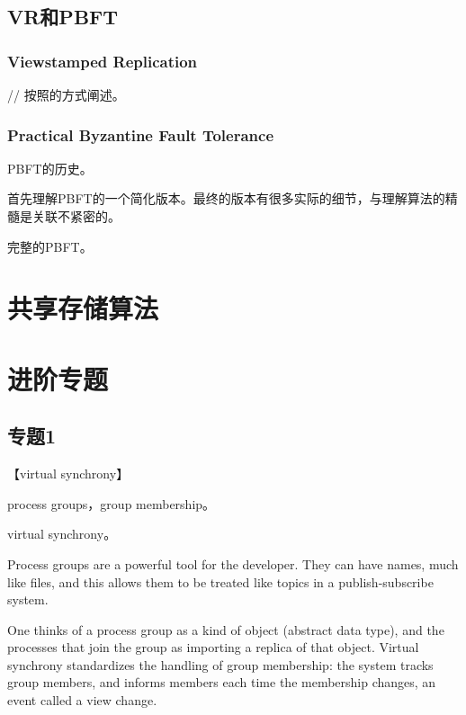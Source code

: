 \documentclass[UTF8]{ctexrep}
\begin{document}
\chapter{VR和PBFT}

\section{Viewstamped Replication}

// 按照\citep[Chap.7]{Bost10}的方式阐述。

\section{Practical Byzantine Fault Tolerance}

PBFT的历史。

首先理解PBFT的一个简化版本。最终的版本有很多实际的细节，与理解算法的精髓是关联不紧密的。

完整的PBFT。

\citep[Chap.7]{Bost10}


\part{共享存储算法}


\part{进阶专题}

\chapter{专题1}


【virtual synchrony】

process groups，group membership。

virtual synchrony。

\cite[Chap.6]{Bost10}

Process groups are a powerful tool for the developer. They can have names, much like files, and this allows them to be treated like topics in a publish-subscribe system. 

One thinks of a process group as a kind of object (abstract data type), and the processes that join the group as importing a replica of that object. Virtual synchrony standardizes the handling of group membership: the system tracks group members, and informs members each time the membership changes, an event called a view change.
\end{document}
